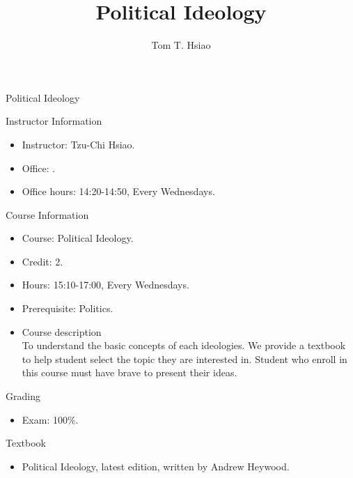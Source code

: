 \documentclass{article}
\title{Political Ideology}
\author{Tom T. Hsiao}
\date{}
\begin{document}
\begin{center}
\fontsize{16pt}{16pt}\selectfont Political Ideology \\
\end{center}
\fontsize{14pt}{14pt}\selectfont
\begin{flushleft}
Instructor Information
\end{flushleft}
\begin{itemize}
\item Instructor: Tzu-Chi Hsiao. \\
\item Office: . \\
\item Office hours: 14:20-14:50, Every Wednesdays. \\
\end{itemize}
Course Information \\
\begin{itemize}
\item Course: Political Ideology. \\
\item Credit: 2. \\
\item Hours: 15:10-17:00, Every Wednesdays. \\
\item Prerequisite: Politics. \\
\item Course description \\
To understand the basic concepts of each ideologies. We provide a textbook to help student select the topic they are interested in. Student who enroll in this course must have brave to present their ideas. \\
\end{itemize}
\begin{flushleft}
Grading \\
\end{flushleft}
\begin{itemize}
\item Exam: 100\%. \\
\end{itemize}
Textbook \\
\begin{itemize}
\item Political Ideology, latest edition, written by Andrew Heywood. \\
\end{itemize}
\end{document}
